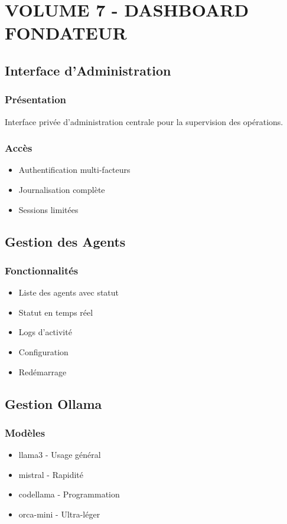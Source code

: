 \documentclass[12pt,a4paper,oneside]{book}
\begin{document}
\part{VOLUME 7 - DASHBOARD FONDATEUR}

\chapter{Interface d'Administration}

\section{Présentation}
Interface privée d'administration centrale pour la supervision des opérations.

\section{Accès}
\begin{itemize}
\item Authentification multi-facteurs
\item Journalisation complète
\item Sessions limitées
\end{itemize}

\chapter{Gestion des Agents}

\section{Fonctionnalités}
\begin{itemize}
\item Liste des agents avec statut
\item Statut en temps réel
\item Logs d'activité
\item Configuration
\item Redémarrage
\end{itemize}

\chapter{Gestion Ollama}

\section{Modèles}
\begin{itemize}
\item llama3 - Usage général
\item mistral - Rapidité
\item codellama - Programmation
\item orca-mini - Ultra-léger
\end{itemize}
\end{document}

